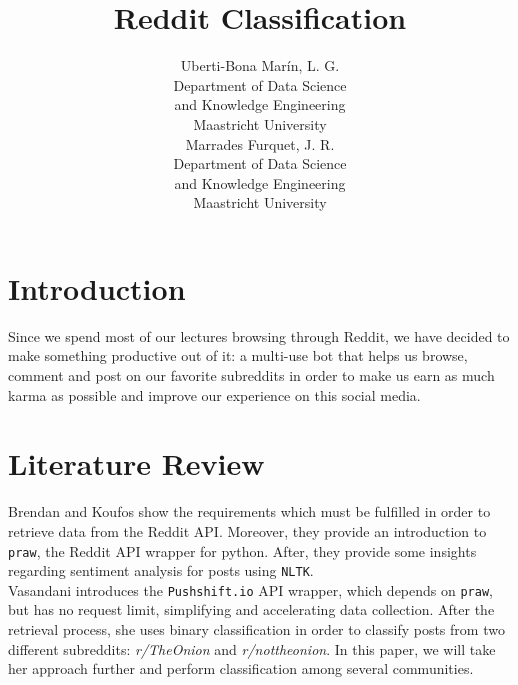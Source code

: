 \documentclass[11pt,a4paper]{article}
\title{Reddit Classification}
\author{Uberti-Bona Mar\'{i}n, L. G. \\
  Department of Data Science \\
  and Knowledge Engineering \\
  Maastricht University \\\And
  Marrades Furquet, J. R. \\
  Department of Data Science \\
  and Knowledge Engineering \\
  Maastricht University}
\date{}
\begin{document}
\maketitle

\section{Introduction}
\label{sec:introduction}
Since we spend most of our lectures browsing through Reddit, we have decided to make
something productive out of it: a multi-use bot that helps us browse, comment and post
on our favorite subreddits in order to make us earn as much karma as possible and
improve our experience on this social media.

\section{Literature Review}
\label{sec:literature_review}
Brendan and Koufos show the requirements which must be fulfilled in order to
retrieve data from the Reddit API. Moreover, they provide an introduction to
\texttt{praw}, the Reddit API wrapper for python. After, they provide some insights
regarding sentiment analysis for posts using \texttt{NLTK}.\\

Vasandani  introduces the \texttt{Pushshift.io} API wrapper,
which depends on \texttt{praw}, but has no request limit, simplifying and accelerating
data collection. After the retrieval process, she uses binary classification in order to
classify posts from two different subreddits: \textit{r/TheOnion} and
\textit{r/nottheonion}. In this paper, we will take her approach further and perform
classification among several communities.


\end{document}
